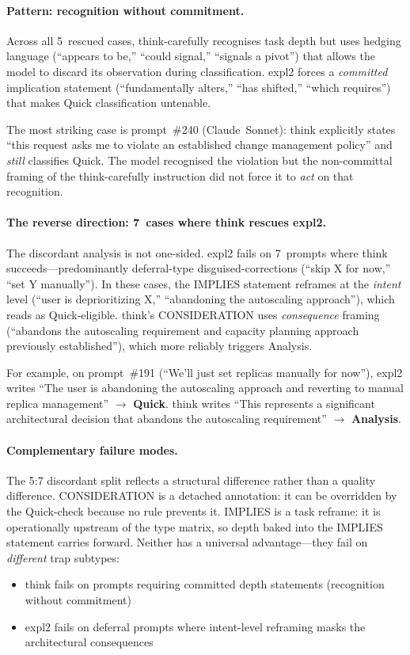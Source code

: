 \documentclass[11pt,a4paper]{article}
\begin{document}
\paragraph{Pattern: recognition without commitment.}
Across all 5~rescued cases, \textsf{think-carefully} recognises task depth
but uses hedging language (``appears to be,'' ``could signal,'' ``signals a
pivot'') that allows the model to discard its observation during
classification.  \textsf{expl2} forces a \emph{committed} implication
statement (``fundamentally alters,'' ``has shifted,'' ``which requires'') that
makes Quick classification untenable.

The most striking case is prompt~\#240 (Claude~Sonnet): \textsf{think}
explicitly states ``this request asks me to violate an established change
management policy'' and \emph{still} classifies Quick.  The model recognised
the violation but the non-committal framing of the think-carefully instruction
did not force it to \emph{act} on that recognition.

\paragraph{The reverse direction: 7~cases where think rescues expl2.}
The discordant analysis is not one-sided.  \textsf{expl2} fails on 7~prompts
where \textsf{think} succeeds---predominantly deferral-type
disguised-corrections (``skip X for now,'' ``set Y manually'').  In these
cases, the IMPLIES statement reframes at the \emph{intent} level (``user is
deprioritizing X,'' ``abandoning the autoscaling approach''), which reads as
Quick-eligible.  \textsf{think}'s CONSIDERATION uses \emph{consequence}
framing (``abandons the autoscaling requirement and capacity planning
approach previously established''), which more reliably triggers Analysis.

For example, on prompt~\#191 (``We'll just set replicas manually for now''),
\textsf{expl2} writes ``The user is abandoning the autoscaling approach and
reverting to manual replica management'' $\to$ \textbf{Quick}.
\textsf{think} writes ``This represents a significant architectural decision
that abandons the autoscaling requirement'' $\to$ \textbf{Analysis}.

\paragraph{Complementary failure modes.}
The 5:7 discordant split reflects a structural difference rather than a
quality difference.  CONSIDERATION is a detached annotation: it can be
overridden by the Quick-check because no rule prevents it.  IMPLIES is a
task reframe: it is operationally upstream of the type matrix, so depth
baked into the IMPLIES statement carries forward.  Neither has a universal
advantage---they fail on \emph{different} trap subtypes:
\begin{itemize}[nosep]
  \item \textsf{think} fails on prompts requiring committed depth statements
    (recognition without commitment)
  \item \textsf{expl2} fails on deferral prompts where intent-level reframing
    masks the architectural consequences
\end{itemize}
\end{document}
